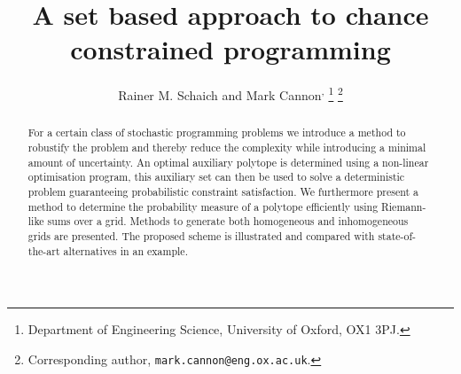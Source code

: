 \documentclass[letterpaper, 10pt, conference]{ieeeconf} %
\begin{document}
\title{A set based approach to chance constrained programming}

\author{Rainer M. Schaich\textsuperscript{\dag} %
         and Mark Cannon\textsuperscript{\dag,\ddag}%
\thanks{\textsuperscript{\dag} Department of Engineering Science, University of Oxford, OX1 3PJ.}%
\thanks{\textsuperscript{\ddag} Corresponding author, 
        \texttt{mark.cannon@eng.ox.ac.uk}.}
}
\newcommand{\note}[1]{\todo[inline]{#1}}

\maketitle

\begin{abstract} 
For a certain class of stochastic programming problems we introduce a method to robustify the problem and thereby reduce the complexity while introducing a minimal amount of uncertainty.
%
An optimal auxiliary polytope is determined using a non-linear optimisation program, this auxiliary set can then be used to solve a deterministic problem guaranteeing probabilistic constraint satisfaction.
%
We furthermore present a method to determine the probability measure of a polytope efficiently using Riemann-like sums over a grid.
%
Methods to generate both homogeneous and inhomogeneous grids are presented.
%
The proposed scheme is illustrated and compared with state-of-the-art alternatives in an example.
\end{abstract}

\end{document}

